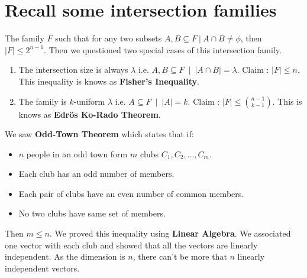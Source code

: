 \section{Recall some intersection families}
The family $F$ such that for any two subsets $A,B\subseteq F ~|~ A\cap B \neq \phi$, then $|F| \le 2^{n-1}$. Then we questioned two special cases of this intersection family.
\begin{enumerate}
    \item The intersection size is always $\lambda$ i.e. $A,B \subseteq F ~ \mid ~ |A \cap B|=\lambda$. Claim : $\boxed{|F|\le n}$. This inequality is knows as \textbf{Fisher's Inequality}.
    \item The family is $k$-uniform $\lambda$ i.e. $A \subseteq F ~ \mid ~ |A|=k$. Claim : $\boxed{|F|\le {{n-1}\choose{k-1}}}$. This is knows as \textbf{Edr{\"o}s Ko-Rado Theorem}.
\end{enumerate}
We saw \textbf{Odd-Town Theorem} which states that if:
\begin{itemize}
    \item $n$ people in an odd town form $m$ clubs $C_1, C_2, \hdots, C_m$.
    \item Each club has an odd number of members.
    \item Each pair of clubs have an even number of common members.
    \item No two clubs have same set of members.
\end{itemize}
Then $m\le n$. We proved this inequality using \textbf{Linear Algebra}. We associated one vector with each club and showed that all the vectors are linearly independent. As the dimension is $n$, there can't be more that $n$ linearly independent vectors.

